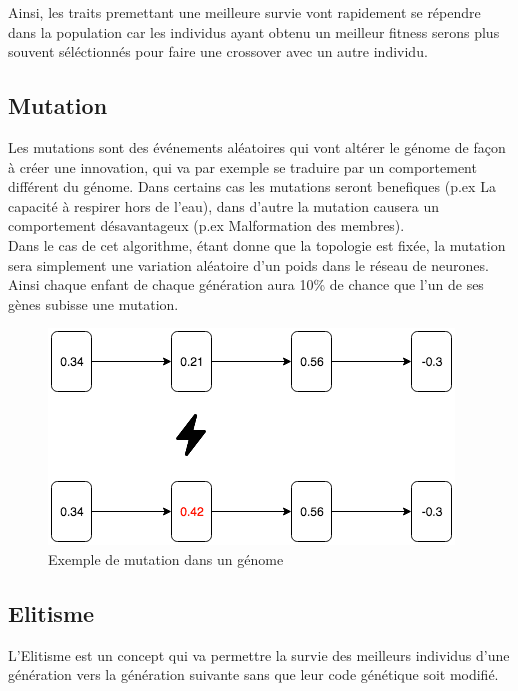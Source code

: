 \documentclass{article}
\begin{document}
Ainsi, les traits premettant une meilleure survie vont rapidement se répendre dans la population car les individus ayant obtenu un meilleur fitness serons plus souvent séléctionnés pour faire une crossover avec un autre individu.

\subsection{Mutation}

Les mutations sont des événements aléatoires qui vont altérer le génome de façon à créer une innovation, qui va par exemple se traduire par un comportement différent du génome. Dans certains cas les mutations seront benefiques (p.ex La capacité à respirer hors de l'eau), dans d'autre la mutation causera un comportement désavantageux (p.ex Malformation des membres).\\

Dans le cas de cet algorithme, étant donne que la topologie est fixée, la mutation sera simplement une variation aléatoire d'un poids dans le réseau de neurones. Ainsi chaque enfant de chaque génération aura 10\% de chance que l'un de ses gènes subisse une mutation.

\begin{figure}[h]
\begin{center}
	\includegraphics[scale=0.6]{mutation.png}
	\caption{Exemple de mutation dans un génome}
\end{center}
\end{figure}
\newpage

\subsection{Elitisme}

L'Elitisme est un concept qui va permettre la survie des meilleurs individus d'une génération vers la génération suivante sans que leur code génétique soit modifié.\\
\end{document}

